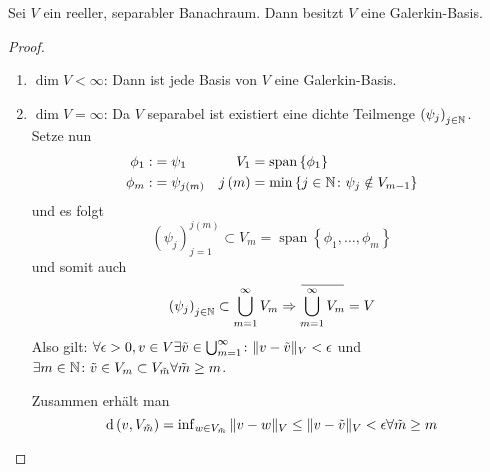 \begin{lemma}
	Sei $V$ ein reeller, separabler Banachraum. Dann besitzt $V$ eine Galerkin-Basis.
\end{lemma}
\begin{proof}
	\begin{enumerate}
		\item $\operatorname{dim} V<\infty$: Dann ist jede Basis von $V$ eine Galerkin-Basis.
		\item $\operatorname{dim} V=\infty$: Da $V$ separabel ist existiert eine dichte Teilmenge $\left(\psi_{j}\right)_{j\in\mathbb{N}}$.\\
			Setze nun
			\begin{align*}
				\phi_{1} :&= \psi_{1} & V_{1} &= \operatorname{span}\left\{\phi_{1}\right\}\\
				\phi_{m} :&= \psi_{j\left(m\right)} & j\left(m\right) &= \operatorname{min}\left\{j\in\mathbb{N}\colon \psi_{j}\notin V_{m-1}\right\}
			\end{align*}
			und es folgt
			\begin{equation*}
				\left(\psi_{j}\right)_{j=1}^{j\left(m\right)}\subset V_{m} = \operatorname{span}\left\{\phi_{1},\dots,\phi_{m}\right\}
			\end{equation*}
			und somit auch
			\begin{equation*}
				\left(\psi_{j}\right)_{j\in\N}\subset \bigcup_{m=1}^{\infty} V_{m} \implies \overbar{\bigcup_{m=1}^{\infty}V_{m}} = V
			\end{equation*}
			Also gilt: $\forall \epsilon>0,v\in V\exists\tilde{v}\in\bigcup_{m=1}^{\infty}\colon\|v-\tilde{v}\|_{V} < \epsilon$ und $\exists m\in\mathbb{N}\colon\tilde{v}\in V_{m}\subset V_{\tilde{m}}\forall\tilde{m} \geq m$.
			
			Zusammen erhält man
			\begin{equation*}
				\operatorname{d}\left(v,V_{\tilde{m}}\right) = \operatorname{inf}_{w\in V_{\tilde{m}}}\|v-w\|_{V} \leq \|v-\tilde{v}\|_{V} < \epsilon \forall\tilde{m}\geq m
			\end{equation*}
	\end{enumerate}
\end{proof}

